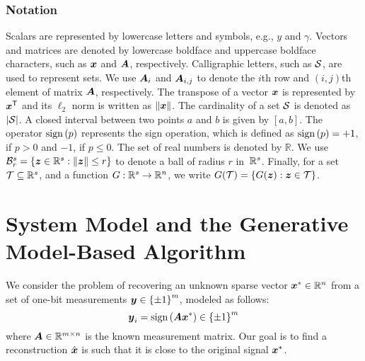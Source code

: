 \documentclass[journal]{IEEEtran}
\DeclareMathOperator{\sign}{sign}
\begin{document}
\subsubsection*{Notation} Scalars are represented by lowercase letters and symbols, e.g., $y$ and $\gamma$. Vectors and matrices are denoted by lowercase boldface and uppercase boldface characters, such as $\boldsymbol{x}$ and $\boldsymbol{A}$, respectively. Calligraphic letters, such as $\mathcal{S}$, are used to represent sets. We use $\boldsymbol{A}_{i}$ and $\boldsymbol{A}_{i,j}$ to denote the $i$th row and $(i,j)$th element of matrix $\boldsymbol{A}$, respectively. The transpose of a vector $\boldsymbol{x}$ is represented by $\boldsymbol{x}^{\mathsf{T}}$ and its $\ell_2$ norm is written as $\| \boldsymbol{x}\|$. The cardinality of a set $\mathcal{S}$ is denoted as $|\mathcal{S}|$. A closed interval between two points $a$ and $b$ is given by $[a,b]$. The operator $\sign\lb p\rb$ represents the sign operation, which is defined as $\sign\lb p\rb = +1$, if $p> 0$ and $-1$, if $p\leq 0.$ The set of real numbers is denoted by $\mathbb{R}$.  We use $\mathcal{B}^s_r=\left\{\boldsymbol{z}\in\mathbb{R}^s:\left\Vert\boldsymbol{z}\right\Vert\leq r\right\}$ to denote a ball of radius $r$ in~$\mathbb{R}^s$. Finally, for a set $\mathcal{T} \subseteq \mathbb{R}^s$, and a function $G: \mathbb{R}^s\to\mathbb{R}^n$, we write $G(\mathcal{T}) = \{G(\boldsymbol{z}): \boldsymbol{z} \in \mathcal{T}\}$.



\section{System Model and the Generative Model-Based Algorithm}
We consider the problem of recovering an unknown sparse vector $\boldsymbol{x}^*\in\mathbb{R}^n$ from a set of one-bit measurements $\boldsymbol{y}\in\left\{\pm1\right\}^m$,  modeled as follows:
\begin{equation}\label{eq:model}
\vecy_i=\sign\lb\matA\vecx^*\rb \in\lc\pm1\rc^m
\end{equation}
where $\boldsymbol{A}\in\mathbb{R}^{m\times n}$ is the known measurement matrix. Our goal is to find a reconstruction $\hat{\boldsymbol{x}}$ is such that it is close to the original signal $\boldsymbol{x}^*$.
\end{document}
